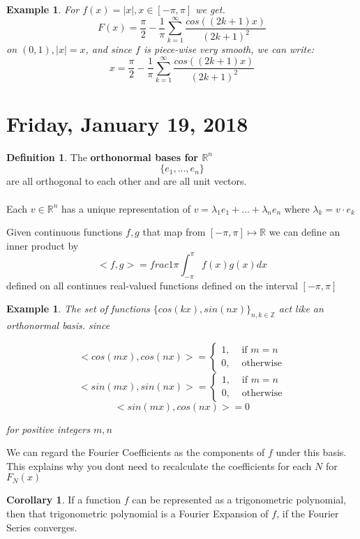 \documentclass[12pt]{article}
\theoremstyle{plain}
\newtheorem{example}[theorem]{Example}
\theoremstyle{definition}
\newtheorem{definition}[theorem]{Definition}
\newtheorem{corollary}[theorem]{Corollary}
\begin{document}
\begin{example}
	For $f(x)=|x|, x\in [-\pi,\pi]$ we get.
	$$F(x) = \frac{\pi}{2} - \frac{1}{\pi}\sum^\infty_{k=1} \frac{cos((2k+1)x)}{(2k+1)^2}$$
	on $(0,1), |x|=x$, and since $f$ is piece-wise very smooth, we can write:
	$$x=\frac{\pi}{2} - \frac{1}{\pi}\sum^\infty_{k=1} \frac{cos((2k+1)x)}{(2k+1)^2}$$
\end{example}

\section{Friday, January 19, 2018}

\begin{definition}
	The \textbf{orthonormal bases for $\mathbb{R}^n$}
	$$\{ e_1, ..., e_n \}$$
	are all orthogonal to each other and are all unit vectors.\\
	\\
	Each $v\in \mathbb{R}^n$ has a unique representation of
	$v = \lambda_1 e_1 + ... + \lambda_n e_n$ where $\lambda_k = v \cdot e_k$
\end{definition}

Given continuous functions $f,g$ that map from $[-\pi, \pi] \mapsto \mathbb{R}$ we can define an inner product by
$$<f,g> = frac{1}{\pi} \int^{\pi}_{-\pi} f(x) g(x) dx$$ defined on all continues real-valued functions defined on the interval $[-\pi, \pi] $

\begin{example}
	The set of functions $\{ cos(kx), sin(nx) \}_{n,k\in\mathbb{Z}}$ act like an orthonormal basis. since

	$$<cos(mx), cos(nx)> = \begin{cases}1, &\text{ if } m=n\\ 0, &\text{ otherwise} \end{cases}$$
	$$<sin(mx), sin(nx)> = \begin{cases}1, &\text{ if } m=n\\ 0, &\text{ otherwise} \end{cases}$$
	$$<sin(mx), cos(nx)> = 0$$

	for positive integers $m,n$
\end{example}

We can regard the Fourier Coefficients as the components of $f$ under this basis. This explains why you dont need to recalculate the coefficients for each $N$ for $F_N (x)$

\begin{corollary}
	If a function $f$ can be represented as a trigonometric polynomial, then that trigonometric polynomial is a Fourier Expansion of $f$, if the Fourier Series converges.
\end{corollary}
\end{document}
